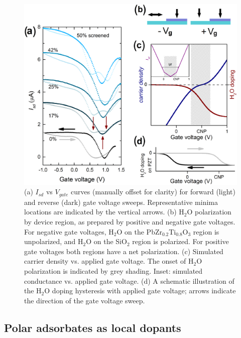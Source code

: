 \documentclass[edeposit,fullpage,draftthesis]{uiucthesis2009}
\begin{document}
\begin{figure}
  \centering
  \includegraphics[width=.8\textwidth]{images/resultsanddiscussion/pztpaper/figure3}

  \caption[Polariztion induced hysteresis in I-V curves on graphene-ferroelectric pn junctions]{
   (a) $I_{sd}$ vs $V_{gate}$ curves (manually offset for clarity) for forward (light) and reverse (dark) gate voltage sweeps. Representative minima locations are indicated by the vertical arrows.
   (b) H$_2$O polarization by device region, as prepared by positive and negative gate voltages. For negative gate voltages, H$_2$O on the PbZr$_{0.2}$Ti$_{0.8}$O$_3$ region is unpolarized, and H$_2$O on the SiO$_2$ region is polarized. For positive gate voltages both regions have a net polarization.
   (c) Simulated carrier density vs. applied gate voltage. The onset of H$_2$O polarization is indicated by grey shading. Inset: simulated conductance vs. applied gate voltage.
   (d) A schematic illustration of the H$_2$O doping hysteresis with applied gate voltage; arrows indicate the direction of the gate voltage sweep.
  }
  \label{fig:doping_dynamics}
\end{figure}

    \subsection{Polar adsorbates as local dopants}
    
\end{document}
